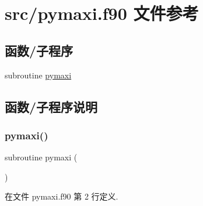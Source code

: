 \hypertarget{pymaxi_8f90}{}\section{src/pymaxi.f90 文件参考}
\label{pymaxi_8f90}
\subsection*{函数/子程序}
\begin{DoxyCompactItemize}
\item 
subroutine \mbox{\hyperlink{pymaxi_8f90_aa9cb6f1467302508501201a0e38959d1}{pymaxi}}
\end{DoxyCompactItemize}


\subsection{函数/子程序说明}
\mbox{\label{pymaxi_8f90_aa9cb6f1467302508501201a0e38959d1}} 
\subsubsection{\texorpdfstring{pymaxi()}{pymaxi()}}
{\footnotesize\ttfamily subroutine pymaxi (\begin{DoxyParamCaption}{ }\end{DoxyParamCaption})}



在文件 pymaxi.\+f90 第 2 行定义.


